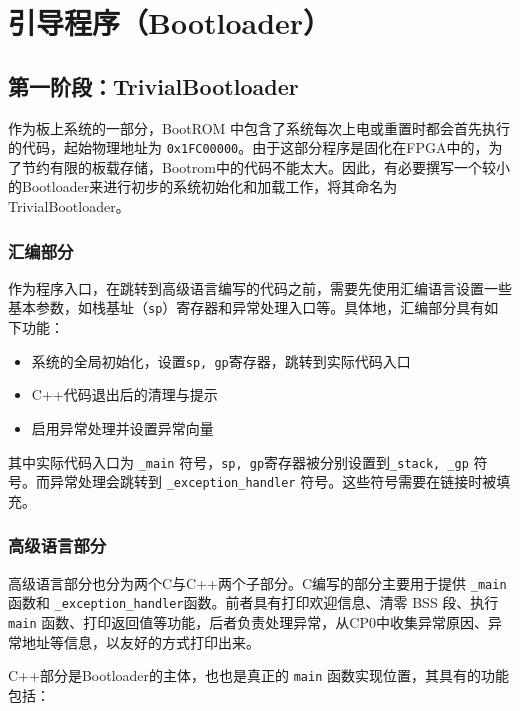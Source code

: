 \chapter{引导程序（Bootloader）}

\section{第一阶段：TrivialBootloader}

作为板上系统的一部分，BootROM 中包含了系统每次上电或重置时都会首先执行的代码，起始物理地址为 \texttt{0x1FC00000}。由于这部分程序是固化在FPGA中的，为了节约有限的板载存储，Bootrom中的代码不能太大。因此，有必要撰写一个较小的Bootloader来进行初步的系统初始化和加载工作，将其命名为TrivialBootloader。

\subsection{汇编部分}

作为程序入口，在跳转到高级语言编写的代码之前，需要先使用汇编语言设置一些基本参数，如栈基址（\texttt{sp}）寄存器和异常处理入口等。具体地，汇编部分具有如下功能：

\begin{itemize}
    \item 系统的全局初始化，设置\texttt{sp, gp}寄存器，跳转到实际代码入口
    \item C++代码退出后的清理与提示
    \item 启用异常处理并设置异常向量
\end{itemize}

其中实际代码入口为 \texttt{\_main} 符号，\texttt{sp, gp}寄存器被分别设置到\texttt{\_stack, \_gp} 符号。而异常处理会跳转到 \texttt{\_exception\_handler} 符号。这些符号需要在链接时被填充。

\subsection{高级语言部分}

高级语言部分也分为两个C与C++两个子部分。C编写的部分主要用于提供 \texttt{\_main} 函数和 \texttt{\_exception\_handler}函数。前者具有打印欢迎信息、清零 BSS 段、执行 \texttt{main} 函数、打印返回值等功能，后者负责处理异常，从CP0中收集异常原因、异常地址等信息，以友好的方式打印出来。

C++部分是Bootloader的主体，也也是真正的 \texttt{main} 函数实现位置，其具有的功能包括：

